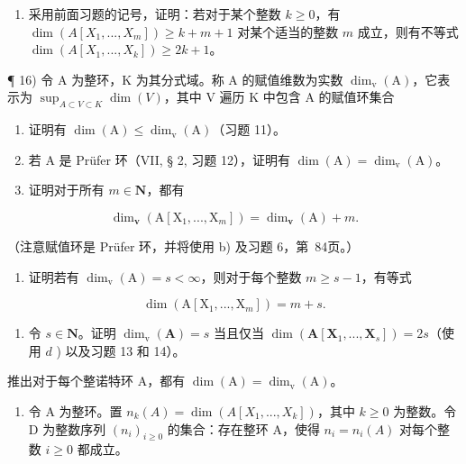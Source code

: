 \begin{enumerate}
\def\labelenumi{\arabic{enumi})}
\setcounter{enumi}{14}
\tightlist
\item
  采用前面习题的记号，证明：若对于某个整数 \(k \geqslant 0\)，有 \(\dim(A[X_1, ..., X_m]) \geqslant k + m + 1\) 对某个适当的整数 \(m\) 成立，则有不等式 \(\dim(A[X_1, ..., X_k]) \geqslant 2k + 1\)。
\end{enumerate}

  ¶ 16) 令 A 为整环，K 为其分式域。称 A 的赋值维数为实数 \(\dim_{\mathrm v}(\mathrm A)\)，它表示为 \(\sup_{A \subset V \subset K} \dim(V)\)，其中 V 遍历 K 中包含 A 的赋值环集合

\begin{enumerate}
\def\labelenumi{\alph{enumi})}
\item
  证明有 \(\dim(\mathrm A) \leqslant \dim_{\mathrm v}(\mathrm A)\)（习题 11）。
\item
  若 A 是 Prüfer 环（VII, § 2, 习题 12），证明有 \(\dim(\mathrm A) = \dim_{\mathrm v}(\mathrm A)\)。
\item
  证明对于所有 \(m \in \mathbf{N}\)，都有
\end{enumerate}

\[
\dim_ {\mathbf {v}} (\mathrm{A} [ \mathrm{X} _ {1},..., \mathrm{X} _ {m} ]) = \dim_ {\mathbf {v}} (\mathrm{A}) + m.
\]

（注意赋值环是 Prüfer 环，并将使用 b) 及习题 6，第~84页。）

\begin{enumerate}
\def\labelenumi{\alph{enumi})}
\setcounter{enumi}{3}
\tightlist
\item
  证明若有 \(\dim_{\mathrm v}(\mathrm A) = s < \infty\)，则对于每个整数 \(m \geqslant s - 1\)，有等式
\end{enumerate}

\[
\dim (\mathrm{A} [ \mathrm{X} _ {1},..., \mathrm{X} _ {m} ]) = m + s.
\]

\begin{enumerate}
\def\labelenumi{\alph{enumi})}
\setcounter{enumi}{4}
\tightlist
\item
  令 \(s \in \mathbf{N}\)。证明 \(\dim_{\mathrm{v}}(\mathbf{A}) = s\) 当且仅当 \(\dim(\mathbf{A}[\mathbf{X}_1, ..., \mathbf{X}_s]) = 2s\)（使用 \(d\) ) 以及习题 13 和 14）。
\end{enumerate}

推出对于每个整诺特环 A，都有 \(\dim(\mathrm{A}) = \dim_{\mathrm{v}}(\mathrm{A})\)。

\begin{enumerate}
\def\labelenumi{\arabic{enumi})}
\setcounter{enumi}{16}
\tightlist
\item
  令 A 为整环。置 \(n_k(A) = \dim(A[X_1, ..., X_k])\)，其中 \(k \geqslant 0\) 为整数。令 D 为整数序列 \((n_i)_{i \geqslant 0}\) 的集合：存在整环 A，使得 \(n_i = n_i(A)\) 对每个整数 \(i \geqslant 0\) 都成立。
\end{enumerate}

